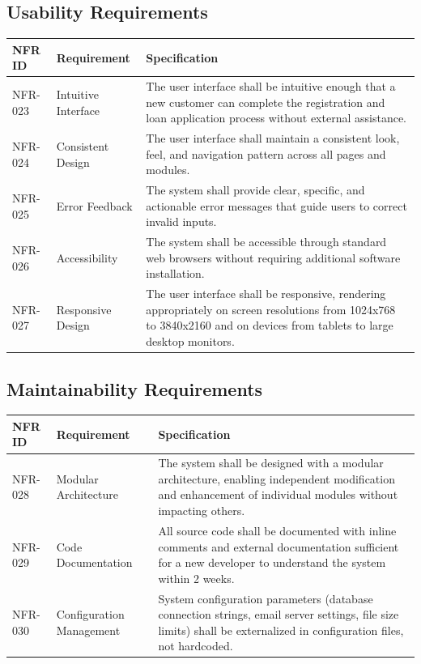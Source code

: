 \documentclass[12pt,a4paper,oneside]{report}
\begin{document}
\subsection{Usability Requirements}

\begin{table}[htbp]
\centering
\small
\begin{tabularx}{\textwidth}{l l X}
\toprule
\textbf{NFR ID} & \textbf{Requirement} & \textbf{Specification} \\
\midrule
NFR-023 & Intuitive Interface & The user interface shall be intuitive enough that a new customer can complete the registration and loan application process without external assistance. \\
NFR-024 & Consistent Design & The user interface shall maintain a consistent look, feel, and navigation pattern across all pages and modules. \\
NFR-025 & Error Feedback & The system shall provide clear, specific, and actionable error messages that guide users to correct invalid inputs. \\
NFR-026 & Accessibility & The system shall be accessible through standard web browsers without requiring additional software installation. \\
NFR-027 & Responsive Design & The user interface shall be responsive, rendering appropriately on screen resolutions from 1024x768 to 3840x2160 and on devices from tablets to large desktop monitors. \\
\bottomrule
\end{tabularx}
\end{table}

\subsection{Maintainability Requirements}

\begin{table}[htbp]
\centering
\small
\begin{tabularx}{\textwidth}{l l X}
\toprule
\textbf{NFR ID} & \textbf{Requirement} & \textbf{Specification} \\
\midrule
NFR-028 & Modular Architecture & The system shall be designed with a modular architecture, enabling independent modification and enhancement of individual modules without impacting others. \\
NFR-029 & Code Documentation & All source code shall be documented with inline comments and external documentation sufficient for a new developer to understand the system within 2 weeks. \\
NFR-030 & Configuration Management & System configuration parameters (database connection strings, email server settings, file size limits) shall be externalized in configuration files, not hardcoded. \\
\bottomrule
\end{tabularx}
\end{table}
\end{document}
